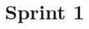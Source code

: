 \documentclass[main.tex]{subfiles} %
\begin{document}
\section{Sprint 1}

\newpage


\newpage
\end{document}
